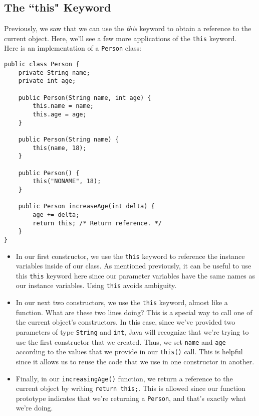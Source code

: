 \subsection{The ``this" Keyword}

Previously, we saw that we can use the \textit{this} keyword to obtain a reference to the current object. Here, we'll see a few more applications of the \verb!this! keyword. \\

Here is an implementation of a \verb!Person! class:

\begin{lstlisting}
public class Person {
    private String name;
    private int age;
    
    public Person(String name, int age) {
        this.name = name;
        this.age = age;
    }
    
    public Person(String name) {
        this(name, 18);
    }
    
    public Person() {
        this("NONAME", 18);
    }
    
    public Person increaseAge(int delta) {
        age += delta;
        return this; /* Return reference. */
    }
}
\end{lstlisting}

\begin{itemize}
    \item In our first constructor, we use the \verb!this! keyword to reference the instance variables inside of our class. As mentioned previously, it can be useful to use this \verb!this! keyword here since our parameter variables have the same names as our instance variables. Using \verb!this! avoids ambiguity. 
    \item In our next two constructors, we use the \verb!this! keyword, almost like a function. What are these two lines doing? This is a special way to call one of the current object's constructors. In this case, since we've provided two parameters of type \verb!String! and \verb!int!, Java will recognize that we're trying to use the first constructor that we created. Thus, we set \verb!name! and \verb!age! according to the values that we provide in our \verb!this()! call. This is helpful since it allows us to reuse the code that we use in one constructor in another.
    \item Finally, in our \verb!increasingAge()! function, we return a reference to the current object by writing \verb!return this;!. This is allowed since our function prototype indicates that we're returning a \verb!Person!, and that's exactly what we're doing. 
\end{itemize}


